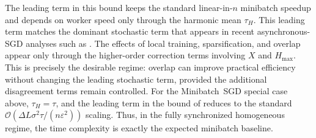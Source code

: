 \documentclass{article}
\theoremstyle{plain}
\theoremstyle{definition}
\newcommand{\algname}[1]{{\color{alggray}\small\sf#1}\xspace}
\newcommand{\minibatch}{\algname{Minibatch~SGD}}
\newcommand{\sgd}{\algname{SGD}}
\begin{document}
% 
The leading term in this bound keeps the standard linear-in-\(n\) minibatch speedup and depends on worker speed only through the harmonic mean \(\tau_H\).
This leading term matches the dominant stochastic term that appears in recent asynchronous-\sgd analyses such as \citet{mishchenko2022asynchronous, koloskova2022sharper}.
The effects of local training, sparsification, and overlap appear only through the higher-order correction terms involving \(X\) and \(H_{\max}\).
This is precisely the desirable regime:
overlap can improve practical efficiency without changing the leading stochastic term, provided the additional disagreement terms remain controlled.
For the \minibatch special case above, \(\tau_H=\tau\), and the leading term in the bound of  reduces to the standard \(\mathcal{O}\!\left(\Delta L \sigma^2 \tau /(n\varepsilon^2)\right)\) scaling.
Thus, in the fully synchronized homogeneous regime, the time complexity is exactly the expected minibatch baseline.
\end{document}
